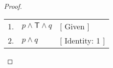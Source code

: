 \begin{proof} \hfill\par
    \begin{tabular}{rll}
        1. & \( p \land \mathsf{T} \land q \) & [ Given ] \\
        2. & \( p \land q \) & [ Identity: 1 ] \\
    \end{tabular} \par
\end{proof}
